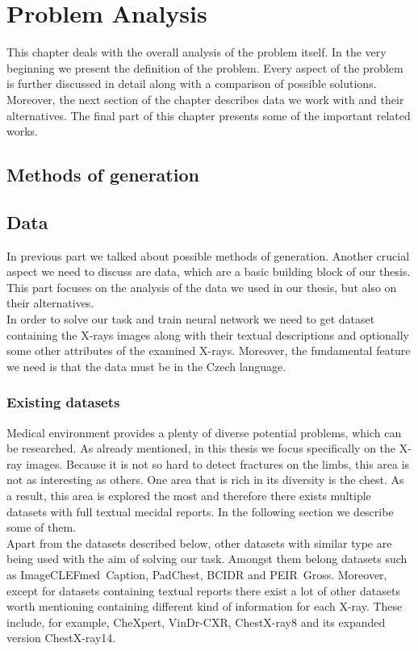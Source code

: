 \chapter{Problem Analysis}
This chapter deals with the overall analysis of the problem itself. In the very beginning we present the definition of the problem. Every aspect of the problem is further discussed in detail along with a comparison of possible solutions. Moreover, the next section of the chapter describes data we work with and their alternatives. The final part of this chapter presents some of the important related works.

\section{Methods of generation}

\section{Data}
In previous part we talked about possible methods of generation. Another crucial aspect we need to discuss are data, which are a basic building block of our thesis. This part focuses on the analysis of the data we used in our thesis, but also on their alternatives. \\

In order to solve our task and train neural network we need to get dataset containing the X-rays images along with their textual descriptions and optionally some other attributes of the examined X-rays. Moreover, the fundamental feature we need is that the data must be in the Czech language.

\subsection{Existing datasets}
Medical environment provides a plenty of diverse potential problems, which can be researched. As already mentioned, in this thesis we focus specifically on the X-ray images. Because it is not so hard to detect fractures on the limbs, this area is not as interesting as others. One area that is rich in its diversity is the chest. As a result, this area is explored the most and therefore there exists multiple datasets with full textual mecidal reports. In the following section we describe some of them.\\

Apart from the datasets described below, other datasets with similar type are being used with the aim of solving our task. Amongst them belong datasets such as ImageCLEFmed~Caption\citep{ImageCLEFmedicalCaptionOverview2022}, PadChest\citep{bustos2020padchest}, BCIDR\citep{zhang2017mdnet} and PEIR~Gross\citep{jing2017automatic}. Moreover, except for datasets containing textual reports there exist a lot of other datasets worth mentioning containing different kind of information for each X-ray. These include, for example, CheXpert\citep{irvin2019chexpert}, VinDr-CXR\citep{nguyen2020vindr}, ChestX-ray8\citep{wang2017chestx} and its expanded version ChestX-ray14.

